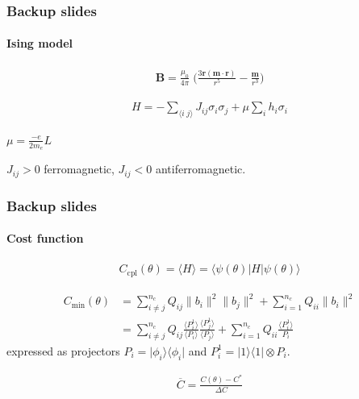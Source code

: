 \documentclass {beamer}
\newcommand {\qvec}[1] {\vert #1 \rangle}
\newcommand {\qcovec}[1] {\langle #1 \vert}
\newcommand {\qeval}[1] {\langle #1 \rangle}
\newcommand {\qouter}[2] {\qvec{#1} \qcovec{#2}}
\newcommand {\qnorm}[1] {\lVert #1 \rVert}
\begin{document}
\begin {frame}
\frametitle {Backup slides}
\framesubtitle {Ising model}

\centering
\begin {align*}
\mathbf{B} = \frac{\mu_0}{4\pi} \; \big(\frac{3\mathbf{r(m \cdot r)}}{r^5}
- \frac{\mathbf{m}}{r^3}\big)
\end {align*}

\begin {align*}
H = - \sum_{\qeval{i\;j}} J_{ij} \sigma_i \sigma_j + \mu \sum_{i} h_i \sigma_i
\end {align*}

$\mu = \frac{-e}{2m_e} L$

\vspace {0.3cm}
$J_{ij} > 0$ ferromagnetic, $J_{ij} < 0$ antiferromagnetic.

\end {frame}

\begin {frame}
\frametitle {Backup slides}
\framesubtitle {Cost function}
\centering

\begin {align*}
C_{\text{cpl}}(\theta) = \qeval{H} = \qcovec{\psi(\theta)} H \qvec{\psi(\theta)}
\end {align*}

\begin {align*}
C_{\text{min}}(\theta)
&= \sum_{i \neq j}^{n_c} Q_{ij} \qnorm{b_i}^2 \qnorm{b_j}^2
+ \sum_{i=1}^{n_c} Q_{ii} \qnorm{b_i}^2 \\
&= \sum_{i \neq j}^{n_c} Q_{ij}
\frac{\qeval{P_i^1}}{\qeval{P_i}} \frac{\qeval{P_j^1}}{\qeval{P_j}}
+ \sum_{i=1}^{n_c} Q_{ii} \frac {\qeval{P_i^1}} {P_i}
\end {align*}
expressed as projectors $P_i = \qouter{\phi_i}{\phi_i}$ and
$P_i^1 = \qouter{1}{1} \otimes P_i$.

\begin {align*}
\overline{C} = \frac{C(\theta) - C^*}{\Delta C}
\end {align*}

\end {frame}
\end{document}
